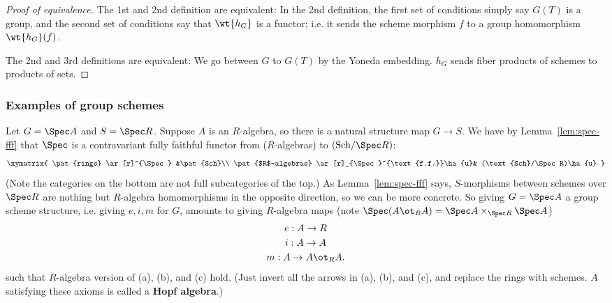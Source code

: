 %
\begin{proof}[Proof of equivalence]
The 1st and 2nd definition are equivalent: In the 2nd definition, the first set of conditions simply say $G(T)$ is a group, and the second set of conditions say that $\wt{h_G}$ is a functor; i.e. it sends the scheme morphism $f$ to a group homomorphism $\wt{h_G}(f)$.

The 2nd and 3rd definitions are equivalent: We go between $G$ to $G(T)$ by the Yoneda embedding. $h_G$ sends fiber products of schemes to products of sets. %
\end{proof}

\vskip0.15in

\subsubsection{Examples of group schemes}

Let $G=\Spec A$ and $S=\Spec R$. Suppose $A$ is an $R$-algebra, so there is a natural structure map $G\to S$. We have by Lemma~\ref{lem:spec-fff} that $\Spec$ is a contravariant fully faithful functor from ($R$-algebras) to $(\text{Sch}/\Spec R)$:
\[
\xymatrix{
\pat{rings} \ar[r]^{\Spec} &\pat{Sch}\\
\pat{$R$-algebras}  \ar[r]_{\Spec}^{\text{f.f.}}\ha{u}& (\text{Sch}/\Spec R)\ha{u}
}
\]
(Note the categories on the bottom are not full subcategories of the top.)
As Lemma~\ref{lem:spec-fff} says,
$S$-morphisms between schemes over $\Spec R$ are nothing but $R$-algebra homomorphisms in the opposite direction, so we can be more concrete. So giving $G=\Spec A$ a group scheme structure, i.e. giving $e,i,m$ for $G$, amounts to giving $R$-algebra maps (note $\Spec(A\ot_R A)=\Spec A \times_{\Spec R}\Spec A$)
\begin{gather*}
e:A\to R\\
i:A\to A\\
m:A\to A\ot_R A.
\end{gather*}
such that $R$-algebra version of (a), (b), and (c) hold. (Just invert all the arrows in (a), (b), and (c), and replace the rings with schemes. $A$ satisfying these axioms is called a \textbf{Hopf algebra}.)

